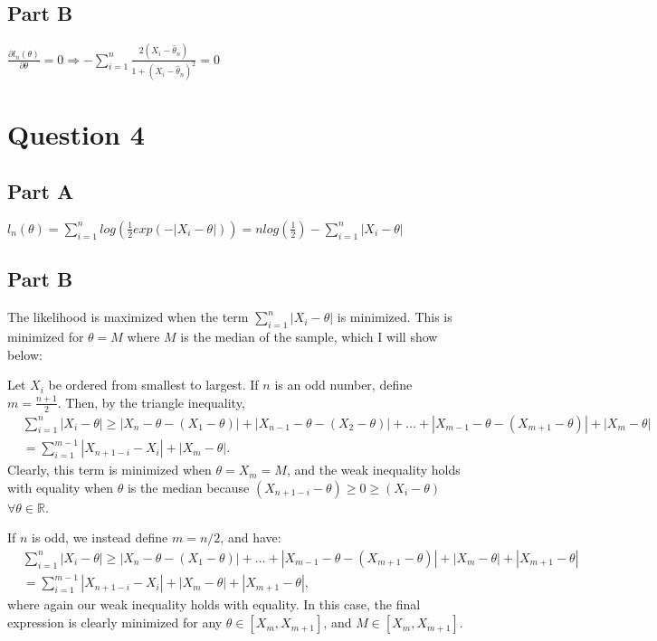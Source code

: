 \documentclass[11pt]{article} %
\begin{document}
\subsection{Part B}
$\frac{\partial l_n(\theta)}{\partial \theta} = 0 \Rightarrow -\sum_{i=1}^n \frac{2(X_i - \hat{\theta}_n)}{1 +(X_i- \hat{\theta}_n)^2 } = 0$
\section{Question 4} %
\subsection{Part A}
$l_n(\theta) = \sum_{i=1}^n log(\frac{1}{2} exp(-|X_i-\theta|)) = n log(\frac{1}{2})  -\sum_{i=1}^n |X_i-\theta|$
\subsection{Part B}
The likelihood is maximized when the term $\sum_{i=1}^n |X_i-\theta|$ is minimized. This is minimized for $\theta = M$ where $M$ is the median of the sample, which I will show below:

Let $X_i$ be ordered from smallest to largest. If $n$ is an odd number, define $m = \frac{n+1}{2}$. Then, by the triangle inequality,
\begin{align*}
&\sum_{i=1}^{n}|X_i - \theta| \geq |X_n - \theta - (X_1 - \theta)| + |X_{n-1} - \theta - (X_2 - \theta)| + \dots + |X_{m-1} - \theta - (X_{m+1} - \theta)| + |X_{m} - \theta| \\&= \sum_{i=1}^{m-1} |X_{n+1-i} - X_i| + |X_m - \theta|.
\end{align*}
Clearly, this term is minimized when $\theta=X_m = M$, and the weak inequality holds with equality when $\theta$ is the median because $(X_{n+1-i} - \theta)\geq 0 \geq( X_i - \theta)$ $\forall \theta \in \mathbb{R}$.

If $n$ is odd, we instead define $m=n/2$, and have:
\begin{align*}
&\sum_{i=1}^{n}|X_i - \theta| \geq |X_n - \theta - (X_1 - \theta)| + \dots + |X_{m-1} - \theta - (X_{m+1} - \theta)| + |X_{m} - \theta| +  |X_{m+1} - \theta| \\&= \sum_{i=1}^{m-1} |X_{n+1-i} - X_i| + |X_m - \theta| + |X_{m+1} - \theta|,
\end{align*}
where again our weak inequality holds with equality. In this case, the final expression is clearly minimized for any $\theta \in [X_m,X_{m+1}]$, and $M\in [X_m,X_{m+1}]$.
\end{document}
